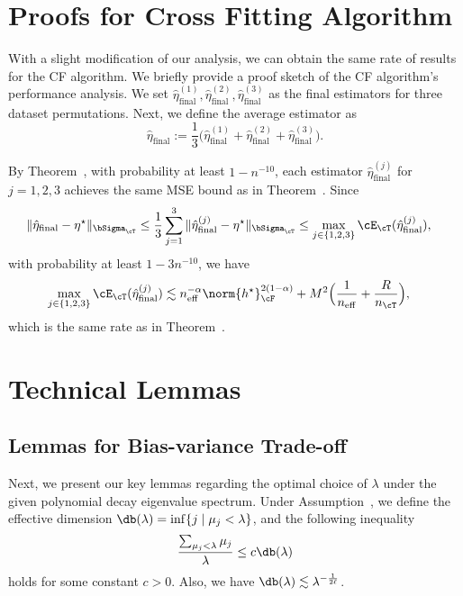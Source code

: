 \documentclass[12pt,a4paper,pdftex,onepage]{article}
\newcommand{\final}{\operatorname{final}}
\begin{document}
\section{Proofs for Cross Fitting Algorithm}\label{subsection; proofs for cross fitting}

With a slight modification of our analysis, we can obtain the same rate of results for the CF algorithm.
We briefly provide a proof sketch of the CF algorithm's performance analysis.
We set \(\hat{\eta}_{\final}^{(1)}, \hat{\eta}_{\final}^{(2)}, \hat{\eta}_{\final}^{(3)}\) as the final estimators for three dataset permutations.
Next, we define the average estimator as
\[
\hat{\eta}_{\final} := \frac{1}{3} \bigl(\hat{\eta}_{\final}^{(1)} 
+\hat{\eta}_{\final}^{(2)} +\hat{\eta}_{\final}^{(3)}\bigr).
\]

By Theorem~, with probability at least \(1-n^{-10}\), each estimator \(\hat{\eta}_{\operatorname{final}}^{(j)}\) for \(j =1,2,3\) achieves the same MSE bound as in Theorem~.
Since
\begin{align*}
\|\hat{\eta}_{\final} -\eta^\star \|_{\bSigma_\cT} 
&\leq  \frac{1}{3} \sum_{j=1}^3 \|\hat{\eta}_{\final}^{(j)} -\eta^\star \|_{\bSigma_\cT} 
\leq \max_{j \in \{1,2,3\}}\cE_\cT(\hat{\eta}_{\final}^{(j)}),
\end{align*}
with probability at least \(1-3n^{-10}\), we have 
\begin{align*}
\max_{j \in \{1,2,3\}}\cE_\cT(\hat{\eta}_{\final}^{(j)} )
&\lesssim  n_{\operatorname{eff}}^{-\alpha} \norm{h^\star}^{2(1-\alpha)}_\cF 
+ M^2 \Bigl(\frac{1}{n_{\operatorname{eff}}}+ \frac{R}{n_\cT}\Bigr),
\end{align*}
which is the same rate as in Theorem~.

\hfill \BlackBox


\section{Technical Lemmas}

\subsection{Lemmas for Bias-variance Trade-off}

Next, we present our key lemmas regarding the optimal choice of \(\lambda\) under the given polynomial decay eigenvalue spectrum. 
Under Assumption~, we define the effective dimension \(\db(\lambda) = \inf \{j \mid \mu_j < \lambda \}\), and the following inequality
\begin{align*}
\frac{\sum_{\mu_j < \lambda} \mu_j}{\lambda} \leq c \db(\lambda)
\end{align*}
holds for some constant \(c > 0\). Also, we have \(\db(\lambda) \lesssim \lambda^{-\frac{1}{2\ell}}\).
\end{document}
